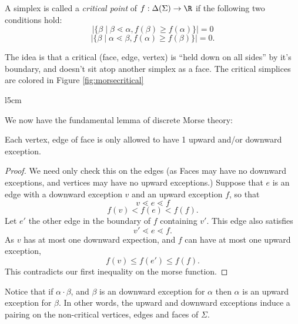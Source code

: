 \begin{definition}
	A simplex is called a \emph{critical point} of $f: \Delta(\Sigma)\to \R$ if the following two conditions hold:
	\[|\{\beta \;|\; \beta\lessdot \alpha ,  f(\beta)\geq f(\alpha)\}|=0\]
\[|\{\beta \;|\; \alpha\lessdot \beta ,  f(\alpha)\geq f(\beta)\}|=0.\]
\end{definition}
The idea is that a critical (face, edge, vertex) is ``held down on all sides'' by it's boundary,  and doesn't sit atop another simplex as a face. The critical simplices are colored in Figure \ref{fig:morsecritical}

\begin{wrapfigure}{l}{5cm}
\caption{Labeling the Critical Simplices}
\label{fig:morsecritical}
\end{wrapfigure}
We now have the fundamental lemma of discrete Morse theory:

\begin{lemma}
Each vertex, edge of face is only allowed to have 1 upward and/or downward exception. 
\end{lemma}
\begin{proof}
	We need only check this on the edges (as Faces may have no downward exceptions, and vertices may have no upward exceptions.)
	Suppose that $e$ is an edge with a downward exception $v$ and an upward exception $f$, so that 
	\[v\lessdot e\lessdot f\]
	\[f(v)< f(e)< f(f).\]
	Let $e'$ the other edge in the boundary of $f$ containing $v'$. This edge also satisfies
	\[v'\lessdot e\lessdot f.\]
	As $v$ has at most one downward expection, and $f$ can have at most one upward exception, 
	\[f(v)\leq f(e') \leq f(f).\]
	This contradicts our first inequality on the morse function. 
\end{proof}
Notice that if $\alpha\cdot \beta$, and $\beta$ is an downward exception for $\alpha$ then $\alpha$ is an upward exception for $\beta$. In other words, the upward and downward exceptions induce a pairing on the non-critical vertices, edges and faces of $\Sigma$. \\

